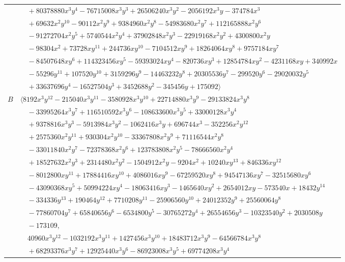 \documentclass[11pt]{article}
\begin{document}
\begin{longtable}{@{}ll@{}}
 & $\quad +80378880x^{3}y^{4}-76715008x^{3}y^{3}+26506240x^{3}y^{2}-2056192x^{3}y-374784x^{3}$\\
 & $\quad +69632x^{2}y^{10}-90112x^{2}y^{9}+9384960x^{2}y^{8}-54983680x^{2}y^{7}+112165888x^{2}y^{6}$\\
 & $\quad -91272704x^{2}y^{5}+5740544x^{2}y^{4}+37902848x^{2}y^{3}-22919168x^{2}y^{2}+4300800x^{2}y$\\
 & $\quad -98304x^{2}+73728xy^{11}+244736xy^{10}-7104512xy^{9}+18264064xy^{8}+9757184xy^{7}$\\
 & $\quad -84507648xy^{6}+114323456xy^{5}-59393024xy^{4}-820736xy^{3}+12854784xy^{2}-4231168xy+340992x$\\
 & $\quad -55296y^{11}+107520y^{10}+3159296y^{9}-14463232y^{8}+20305536y^{7}-299520y^{6}-29020032y^{5}$\\
 & $\quad +33637696y^{4}-16527504y^{3}+3452688y^{2}-345456y+175092\rangle$\\
$B$ & $\langle 8192x^{3}y^{12}-215040x^{3}y^{11}-3580928x^{3}y^{10}+22714880x^{3}y^{9}-29133824x^{3}y^{8}$\\
 & $\quad -33995264x^{3}y^{7}+116510592x^{3}y^{6}-108633600x^{3}y^{5}+33000128x^{3}y^{4}$\\
 & $\quad +9378816x^{3}y^{3}-5913984x^{3}y^{2}-1062416x^{3}y+696744x^{3}-352256x^{2}y^{12}$\\
 & $\quad +2575360x^{2}y^{11}+930304x^{2}y^{10}-33367808x^{2}y^{9}+71116544x^{2}y^{8}$\\
 & $\quad -33011840x^{2}y^{7}-72378368x^{2}y^{6}+123783808x^{2}y^{5}-78666560x^{2}y^{4}$\\
 & $\quad +18527632x^{2}y^{3}+2314480x^{2}y^{2}-1504912x^{2}y-9204x^{2}+10240xy^{13}+846336xy^{12}$\\
 & $\quad -8012800xy^{11}+17884416xy^{10}+4086016xy^{9}-67259520xy^{8}+94547136xy^{7}-32515680xy^{6}$\\
 & $\quad -43090368xy^{5}+50994224xy^{4}-18063416xy^{3}-1465640xy^{2}+2654012xy-573540x+18432y^{14}$\\
 & $\quad -334336y^{13}+190464y^{12}+7710208y^{11}-25906560y^{10}+24012352y^{9}+25560064y^{8}$\\
 & $\quad -77860704y^{7}+65840656y^{6}-6534800y^{5}-30765272y^{4}+26554656y^{3}-10323540y^{2}+2030508y$\\
 & $\quad -173109,$\\
 & $\quad 40960x^{3}y^{12}-1032192x^{3}y^{11}+1427456x^{3}y^{10}+18483712x^{3}y^{9}-64566784x^{3}y^{8}$\\
 & $\quad +68293376x^{3}y^{7}+12925440x^{3}y^{6}-86923008x^{3}y^{5}+69774208x^{3}y^{4}$\\

\end{longtable}
\end{document}
